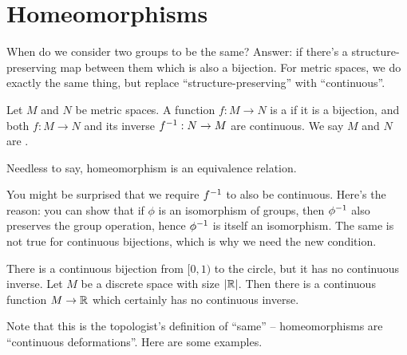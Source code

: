 \section{Homeomorphisms}
When do we consider two groups to be the same?
Answer: if there's a structure-preserving map
between them which is also a bijection.
For metric spaces, we do exactly the same thing,
but replace ``structure-preserving'' with ``continuous''.

\begin{definition}
	Let $M$ and $N$ be metric spaces.
	A function $f : M \to N$ is a
	 if it is a bijection,
	and both $f : M \to N$ and its inverse $f^{-1} : N \to M$ are continuous.
	We say $M$ and $N$ are .
\end{definition}
Needless to say, homeomorphism is an equivalence relation.

You might be surprised that we require $f^{-1}$ to also be continuous.
Here's the reason: you can show that if $\phi$ is
an isomorphism of groups, then $\phi^{-1}$ also preserves the group operation,
hence $\phi^{-1}$ is itself an isomorphism.
The same is not true for continuous bijections,
which is why we need the new condition.
\begin{example}
	\listhack
	\begin{enumerate}[(a)]
		\ii There is a continuous bijection
		from $[0,1)$ to the circle, %
		but it has no continuous inverse.
		\ii Let $M$ be a discrete space with size $|\mathbb R|$.
		Then there is a continuous function $M \to \mathbb R$
		which certainly has no continuous inverse.
	\end{enumerate}
\end{example}

Note that this is the topologist's definition of ``same'' --
homeomorphisms are ``continuous deformations''.
Here are some examples.

